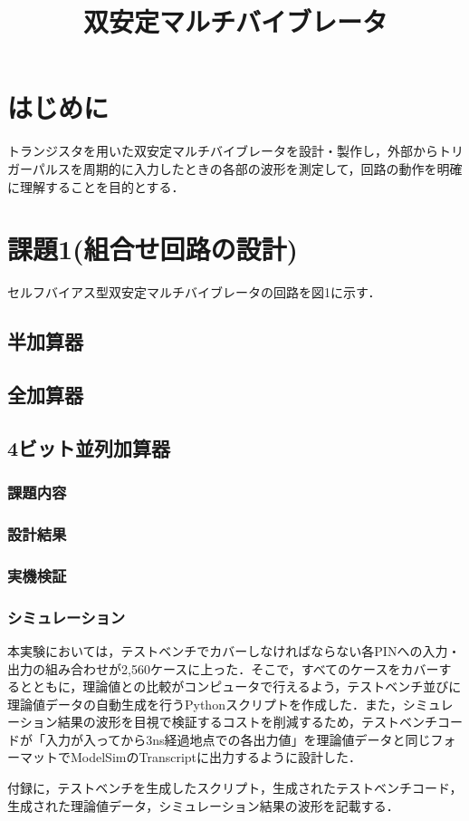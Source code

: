 \documentclass[11pt,a4j]{jarticle}
\title{双安定マルチバイブレータ}
\date{}
\begin{document}
    \section{はじめに}
    トランジスタを用いた双安定マルチバイブレータを設計・製作し，外部からトリガーパルスを周期的に入力したときの各部の波形を測定して，回路の動作を明確に理解することを目的とする．
    \section{課題1(組合せ回路の設計)}
        セルフバイアス型双安定マルチバイブレータの回路を図1に示す．
        \subsection{半加算器}
        \subsection{全加算器}
        \subsection{4ビット並列加算器}
            \subsubsection{課題内容}
            \subsubsection{設計結果}
            \subsubsection{実機検証}
            \subsubsection{シミュレーション}
                本実験においては，テストベンチでカバーしなければならない各PINへの入力・出力の組み合わせが2,560ケースに上った．そこで，すべてのケースをカバーするとともに，理論値との比較がコンピュータで行えるよう，テストベンチ並びに理論値データの自動生成を行うPythonスクリプトを作成した．また，シミュレーション結果の波形を目視で検証するコストを削減するため，テストベンチコードが「入力が入ってから3ns経過地点での各出力値」を理論値データと同じフォーマットでModelSimのTranscriptに出力するように設計した．
                
                付録に，テストベンチを生成したスクリプト，生成されたテストベンチコード，生成された理論値データ，シミュレーション結果の波形を記載する．
\end{document}
